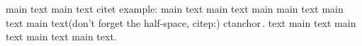 \documentclass{article}
\begin{document}
main text main text citet example: \citet{Test:Book} main text main text main 
main text main text main text(don't forget the half-space, citep:)
ctanchor\,\citep{Test:Book}.
text main text main text main text main text.



\end{document}
